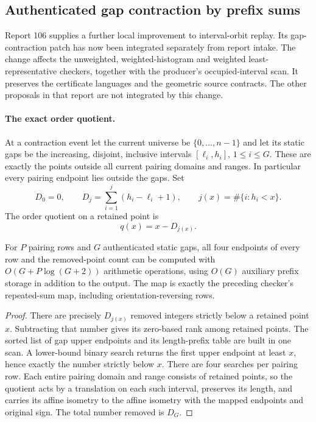 \subsection{Authenticated gap contraction by prefix sums}
\label{marked-cut:gap-prefix}

Report 106 supplies a further local improvement to interval-orbit replay.
Its gap-contraction patch has now been integrated separately from report
intake. The change affects the unweighted, weighted-histogram and weighted
least-representative checkers, together with the producer's occupied-interval
scan. It preserves the certificate languages and the geometric source
contracts. The other proposals in that report are not integrated by this
change.

\paragraph{The exact order quotient.}
At a contraction event let the current universe be
$\{0,\ldots,n-1\}$ and let its static gaps be the increasing, disjoint,
inclusive intervals $[\ell_i,h_i]$, $1\leq i\leq G$. These are exactly the
points outside all current pairing domains and ranges. In particular every
pairing endpoint lies outside the gaps. Set
\[
 D_0=0,\qquad D_j=\sum_{i=1}^j(h_i-\ell_i+1),\qquad
 j(x)=\#\{i:h_i<x\}.
\]
The order quotient on a retained point is
\[
 q(x)=x-D_{j(x)}.
\]

\begin{proposition}
For $P$ pairing rows and $G$ authenticated static gaps, all four endpoints
of every row and the removed-point count can be computed with
$O(G+P\log(G+2))$ arithmetic operations, using $O(G)$ auxiliary prefix
storage in addition to the output. The map is exactly the preceding
checker's repeated-sum map, including orientation-reversing rows.
\end{proposition}
\begin{proof}
There are precisely $D_{j(x)}$ removed integers strictly below a retained
point $x$. Subtracting that number gives its zero-based rank among retained
points. The sorted list of gap upper endpoints and its length-prefix table
are built in one scan. A lower-bound binary search returns the first upper
endpoint at least $x$, hence exactly the number strictly below $x$.
There are four searches per pairing row. Each entire pairing domain and
range consists of retained points, so the quotient acts by a translation
on each such interval, preserves its length, and carries its affine
isometry to the affine isometry with the mapped endpoints and original
sign. The total number removed is $D_G$.
\end{proof}

